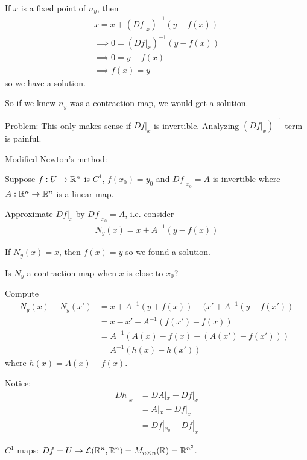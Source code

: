 \documentclass[a4paper]{article}
\begin{document}
If $x$ is a fixed point of $n_y$, then
\begin{equation*}
\begin{aligned}
x=x+(Df|_x)^{-1}(y-f(x))\\
\implies 0=(Df|_x)^{-1}(y-f(x))\\
\implies 0=y-f(x)\\
\implies f(x)=y
\end{aligned}
\end{equation*}
so we have a solution.

So if we knew $n_y$ was a contraction map, we would get a solution.

Problem: This only makes sense if $Df|_x$ is invertible. Analyzing $(Df|_x)^{-1}$ term is painful.

Modified Newton's method:

Suppose $f:U \to \mathbb{R}^n$ is $C^1$, $f(x_0)=y_0$ and $Df|_{x_0} = A$ is invertible where $A:\mathbb{R}^n \to \mathbb{R}^n$ is a linear map.

Approximate $Df|_x$ by $Df|_{x_0} = A$, i.e. consider
\begin{equation*}
\begin{aligned}
N_y(x)=x+A^{-1}(y-f(x))
\end{aligned}
\end{equation*}

If $N_y(x)=x$, then $f(x)=y$ so we found a solution.

Is $N_y$ a contraction map when $x$ is close to $x_0$?

Compute 
\begin{equation*}
\begin{aligned}
N_y(x)-N_y(x') &= x+A^{-1}(y+f(x))-(x'+A^{-1}(y-f(x'))\\
&=x-x'+A^{-1}(f(x')-f(x))\\
&=A^{-1}(A(x)-f(x)-(A(x')-f(x')))\\
&= A^{-1}(h(x)-h(x'))
\end{aligned}
\end{equation*}
where $h(x)=A(x)-f(x)$.

Notice:
\begin{equation*}
\begin{aligned}
Dh|_x &= DA|_x - Df|_x\\
&=A|_x - Df|_x\\
&=Df|_{x_0}-Df|_x
\end{aligned}
\end{equation*}

$C^1$ maps: $Df = U \to \mathcal{L}(\mathbb{R}^n,\mathbb{R}^n) = M_{n\times n} (\mathbb{R}) = \mathbb{R}^{n^2}$.
\end{document}
